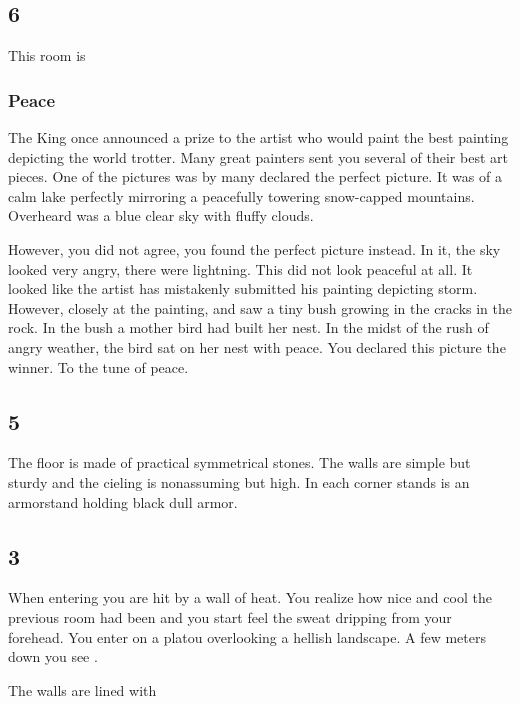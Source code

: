 \subsection*{6}
This room is

\subsubsection*{Peace}
The King once announced a prize to the artist who would paint the best painting depicting the world trotter. Many great painters sent you several of their best art pieces. One of the pictures was by many declared the perfect picture. It was of a calm lake perfectly mirroring a peacefully towering snow-capped mountains. Overheard was a blue clear sky with fluffy clouds.

However, you did not agree, you found the perfect picture instead. In it, the sky looked very angry, there were lightning. This did not look peaceful at all. It looked like the artist has mistakenly submitted his painting depicting storm. However,  closely at the painting, and saw a tiny bush growing in the cracks in the rock. In the bush a mother bird had built her nest. In the midst of the rush of angry weather, the bird sat on her nest with peace. You declared this picture the winner. To the tune of peace.

\subsection*{5}
The floor is made of practical symmetrical stones. The walls are simple but sturdy and the cieling is nonassuming but high. In each corner stands is an armorstand holding black dull armor.

\subsection*{3}
When entering you are hit by a wall of heat. You realize how nice and cool the previous room had been and you start feel the sweat dripping from your forehead. You enter on a platou overlooking a hellish landscape. A few meters down you see .

The walls are lined with 